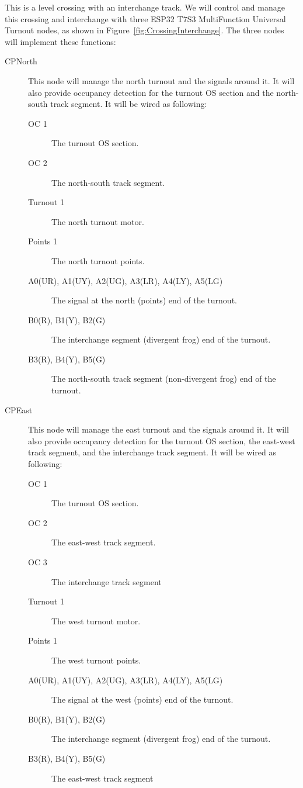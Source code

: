 This is a level crossing with an interchange track.  We will control and 
manage this crossing and interchange with three ESP32 T7S3 MultiFunction 
Universal Turnout nodes, as shown in Figure~\ref{fig:CrossingInterchange}. The 
three nodes will implement these functions:

\begin{description}
\item [CPNorth] This node will manage the north turnout and the signals around 
it.  It will also provide occupancy detection for the turnout OS section and 
the north-south track segment. It will be wired as following:
\begin{description}
\item [OC 1] The turnout OS section.
\item [OC 2] The north-south track segment.
\item [Turnout 1] The north turnout motor.
\item [Points 1] The north turnout points.
\item [A0(UR), A1(UY), A2(UG), A3(LR), A4(LY), A5(LG)] The signal at the north 
(points) end of the turnout.
\item [B0(R), B1(Y), B2(G)] The interchange segment (divergent frog) 
end of the turnout.
\item [B3(R), B4(Y), B5(G)] The north-south track segment 
(non-divergent frog) end of the turnout.
\end{description} 
\item [CPEast] This node will manage the east turnout and the signals 
around it.  It will also provide occupancy detection for the turnout OS 
section, the east-west track segment, and the interchange track segment.  It 
will be wired as following: 
\begin{description}
\item [OC 1] The turnout OS section.
\item [OC 2] The east-west track segment.
\item [OC 3] The interchange track segment
\item [Turnout 1] The west turnout motor.
\item [Points 1] The west turnout points.
\item [A0(UR), A1(UY), A2(UG), A3(LR), A4(LY), A5(LG)] The signal at the west 
(points) end of the turnout.
\item [B0(R), B1(Y), B2(G)] The interchange segment (divergent frog) 
end of the turnout.
\item [B3(R), B4(Y), B5(G)] The east-west track segment 

\end{description}
\end{description}
